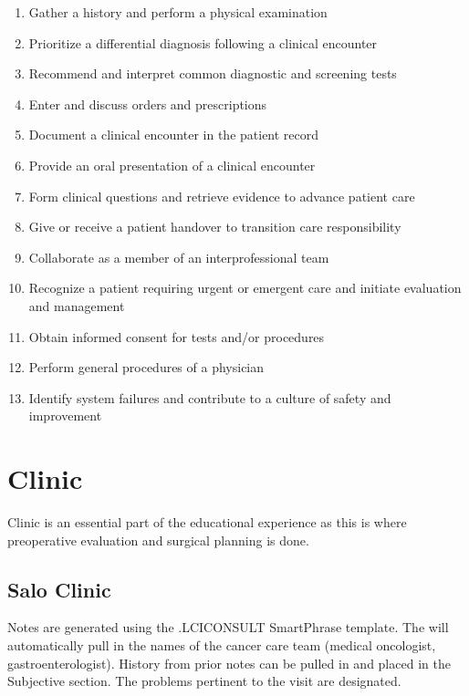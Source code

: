 \documentclass[
]{book}
\providecommand{\tightlist}{%
  \setlength{\itemsep}{0pt}\setlength{\parskip}{0pt}}
\begin{document}
\begin{enumerate}
\def\labelenumi{\arabic{enumi}.}
\tightlist
\item
  Gather a history and perform a physical examination
\item
  Prioritize a differential diagnosis following a clinical encounter
\item
  Recommend and interpret common diagnostic and screening tests
\item
  Enter and discuss orders and prescriptions
\item
  Document a clinical encounter in the patient record
\item
  Provide an oral presentation of a clinical encounter
\item
  Form clinical questions and retrieve evidence to advance patient care
\item
  Give or receive a patient handover to transition care responsibility
\item
  Collaborate as a member of an interprofessional team
\item
  Recognize a patient requiring urgent or emergent care and initiate evaluation and management
\item
  Obtain informed consent for tests and/or procedures
\item
  Perform general procedures of a physician
\item
  Identify system failures and contribute to a culture of safety and improvement
\end{enumerate}

\hypertarget{clinic-1}{%
\chapter{Clinic}\label{clinic-1}}

Clinic is an essential part of the educational experience as this is where preoperative evaluation and surgical planning is done.

\hypertarget{salo-clinic}{%
\section{Salo Clinic}\label{salo-clinic}}

Notes are generated using the .LCICONSULT SmartPhrase template. The will automatically pull in the names of the cancer care team (medical oncologist, gastroenterologist). History from prior notes can be pulled in and placed in the Subjective section. The problems pertinent to the visit are designated.
\end{document}
